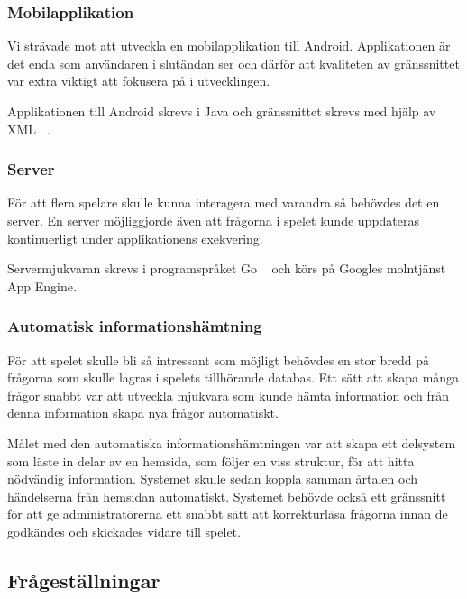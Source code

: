 \documentclass[a4paper, 11pt]{article}
\begin{document}
\subsubsection{Mobilapplikation}
Vi strävade mot att utveckla en mobilapplikation till Android. Applikationen är det enda som användaren i slutändan ser och därför att kvaliteten av gränssnittet var extra viktigt att fokusera på i utvecklingen. 

Applikationen till Android skrevs i Java och gränssnittet skrevs med hjälp av XML ~\cite{xml}. 

\subsubsection{Server}
För att flera spelare skulle kunna interagera med varandra så behövdes det en server. En server möjliggjorde även att frågorna i spelet kunde uppdateras kontinuerligt under applikationens exekvering.

Servermjukvaran skrevs i programspråket Go ~\cite{golang} och körs på Googles molntjänst App Engine.

\subsubsection{Automatisk informationshämtning}
För att spelet skulle bli så intressant som möjligt behövdes en stor bredd på frågorna som skulle lagras i spelets tillhörande databas. Ett sätt att skapa många frågor snabbt var att utveckla mjukvara som kunde hämta information och från denna information skapa nya frågor automatiskt. 

Målet med den automatiska informationshämtningen var att skapa ett delsystem som läste in delar av en hemsida, som följer en viss struktur, för att hitta nödvändig information. Systemet skulle sedan koppla samman årtalen och händelserna från hemsidan automatiskt. Systemet behövde också ett gränssnitt för att ge administratörerna ett snabbt sätt att korrekturläsa frågorna innan de godkändes och skickades vidare till spelet.

\subsection{Frågeställningar}
\end{document}
